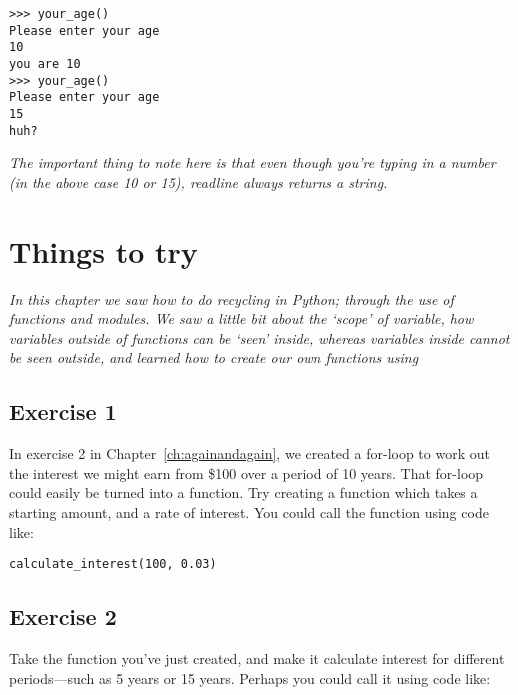 \begin{listingignore}
\begin{verbatim}
>>> your_age()
Please enter your age
10
you are 10
>>> your_age()
Please enter your age
15
huh?
\end{verbatim}
\end{listingignore}

\noindent
\emph{The important thing to note here is that even though you're typing in a number (in the above case 10 or 15), readline always returns a string.}


\section{Things to try}

\emph{In this chapter we saw how to do recycling in Python; through the use of functions and modules.  We saw a little bit about the `scope' of variable, how variables outside of functions can be `seen' inside, whereas variables inside cannot be seen outside, and learned how to create our own functions using }

\subsection*{Exercise 1}
In exercise 2 in Chapter~\ref{ch:againandagain}, we created a for-loop to work out the interest we might earn from \$100 over a period of 10 years.  That for-loop could easily be turned into a function.  Try creating a function which takes a starting amount, and a rate of interest.  You could call the function using code like:

\begin{listing}
\begin{verbatim}
calculate_interest(100, 0.03)
\end{verbatim}
\end{listing}

\subsection*{Exercise 2}
Take the function you've just created, and make it calculate interest for different periods---such as 5 years or 15 years.  Perhaps you could call it using code like:


